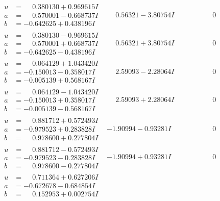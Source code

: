 \documentclass[1p]{elsarticle_modified}
\theoremstyle{definition}
\begin{document}
$$\begin{array}{c|c|c}
\begin{aligned}
u &= \phantom{-}0.380130 + 0.969615 I \\
a &= \phantom{-}0.570001 - 0.668737 I \\
b &= -0.642625 + 0.438196 I\end{aligned}
 & \phantom{-}0.56321 - 3.80754 I & \phantom{-0.000000 } 0 \\ \hline\begin{aligned}
u &= \phantom{-}0.380130 - 0.969615 I \\
a &= \phantom{-}0.570001 + 0.668737 I \\
b &= -0.642625 - 0.438196 I\end{aligned}
 & \phantom{-}0.56321 + 3.80754 I & \phantom{-0.000000 } 0 \\ \hline\begin{aligned}
u &= \phantom{-}0.064129 + 1.043420 I \\
a &= -0.150013 - 0.358017 I \\
b &= -0.005139 + 0.568167 I\end{aligned}
 & \phantom{-}2.59093 - 2.28064 I & \phantom{-0.000000 } 0 \\ \hline\begin{aligned}
u &= \phantom{-}0.064129 - 1.043420 I \\
a &= -0.150013 + 0.358017 I \\
b &= -0.005139 - 0.568167 I\end{aligned}
 & \phantom{-}2.59093 + 2.28064 I & \phantom{-0.000000 } 0 \\ \hline\begin{aligned}
u &= \phantom{-}0.881712 + 0.572493 I \\
a &= -0.979523 + 0.283828 I \\
b &= \phantom{-}0.978600 + 0.277804 I\end{aligned}
 & -1.90994 - 0.93281 I & \phantom{-0.000000 } 0 \\ \hline\begin{aligned}
u &= \phantom{-}0.881712 - 0.572493 I \\
a &= -0.979523 - 0.283828 I \\
b &= \phantom{-}0.978600 - 0.277804 I\end{aligned}
 & -1.90994 + 0.93281 I & \phantom{-0.000000 } 0 \\ \hline\begin{aligned}
u &= \phantom{-}0.711364 + 0.627206 I \\
a &= -0.672678 - 0.684854 I \\
b &= \phantom{-}0.152953 + 0.002754 I\end{aligned}

\end{array}$$
\end{document}
